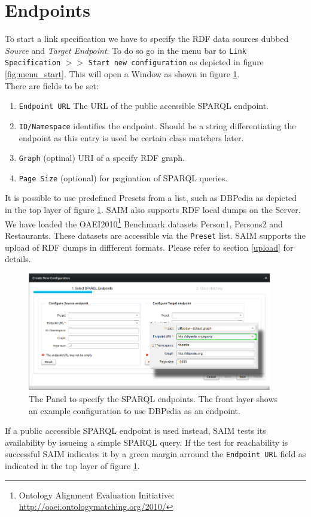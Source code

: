 \documentclass[oneside,a4paper,12pt]{memoir}
\begin{document}
	\section{Endpoints}
	\label{endpoint}
	To start a link specification we have to specify the RDF data sources dubbed \textit{Source} and \textit{Target Endpoint}. To do so go in the menu bar to \texttt{Link Specification} $>>$ \texttt{Start new configuration} as depicted in figure \ref{fig:menu_start}. This will open a Window as shown in figure \ref{fig:endpoint}. \\
	There are fields to be set:
	\begin{enumerate}
		\item \texttt{Endpoint URL} The URL of the public accessible SPARQL endpoint.
		\item \texttt{ID/Namespace} identifies the endpoint. Should be a string differentiating the endpoint as this entry is used be certain class matchers later.
		\item \texttt{Graph} (optinal) URI of a specify RDF graph.
		\item \texttt{Page Size} (optional) for pagination of SPARQL queries.
	\end{enumerate}
	It is possible to use predefined Presets from a list, such as DBPedia as depicted in the top layer of figure \ref{fig:endpoint}. SAIM also supports RDF local dumps on the Server. We have loaded the OAEI2010\footnote{Ontology Alignment Evaluation Initiative: \url{http://oaei.ontologymatching.org/2010/}} Benchmark datasets Person1, Persons2 and Restaurants. These datasets are accessible via the \texttt{Preset} list. SAIM supports the upload of RDF dumps in diffferent formats. Please refer to section \ref{upload} for details.\\
	\begin{figure}[!ht]
		\centering
		\includegraphics[width=0.95\textwidth]{images/endpoint.png}
		\caption{The Panel to specify the SPARQL endpoints. The front layer shows an example configuration to use DBPedia as an endpoint.}
		\label{fig:endpoint}
	\end{figure}
If a public accessible SPARQL endpoint is used instead, SAIM tests its availability by issueing a simple SPARQL query. If the test for reachability is successful SAIM indicates it by a green margin arround the \texttt{Endpoint URL} field as indicated in the top layer of figure \ref{fig:endpoint}.
\end{document}
